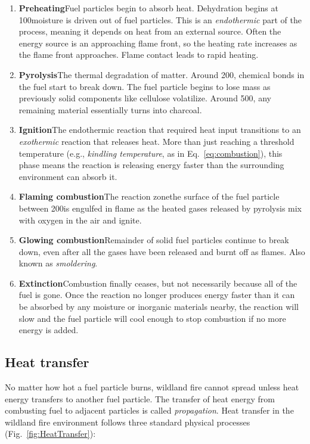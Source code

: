 \begin{enumerate} 
	\item \textbf{Preheating\textemdash}Fuel particles begin to absorb heat. Dehydration begins at 100\degC\textemdash moisture is driven out of fuel particles. This is an \emph{endothermic} part of the process, meaning it depends on heat from an external source. Often the energy source is an approaching flame front, so the heating rate increases as the flame front approaches. Flame contact leads to rapid heating. 
	\item \textbf{Pyrolysis\textemdash}The thermal degradation of matter. Around 200\degC, chemical bonds in the fuel start to break down. The fuel particle begins to lose mass as previously solid components like cellulose volatilize. Around 500\degC, any remaining material essentially turns into charcoal. 
	\item \textbf{Ignition\textemdash}The endothermic reaction that required heat input transitions to an \emph{exothermic} reaction that releases heat. More than just reaching a threshold temperature (e.g., \emph{kindling temperature}, as in Eq.~\ref{eq:combustion}), this phase means the reaction is releasing energy faster than the surrounding environment can absorb it.
	\item \textbf{Flaming combustion\textemdash}The reaction zone\textemdash the surface of the fuel particle between 200\degC\textemdash is engulfed in flame as the heated gases released by pyrolysis mix with oxygen in the air and ignite.
	\item \textbf{Glowing combustion\textemdash}Remainder of solid fuel particles continue to break down, even after all the gases have been released and burnt off as flames. Also known as \emph{smoldering}. 
	\item \textbf{Extinction\textemdash}Combustion finally ceases, but not necessarily because all of the fuel is gone. Once the reaction no longer produces energy faster than it can be absorbed by any moisture or inorganic materials nearby, the reaction will slow and the fuel particle will cool enough to stop combustion if no more energy is added. 
\end{enumerate}

\subsection{Heat transfer}

No matter how hot a fuel particle burns, wildland fire cannot spread unless heat energy transfers to another fuel particle. 
The transfer of heat energy from combusting fuel to adjacent particles is called \emph{propagation}. 
Heat transfer in the wildland fire environment follows three standard physical processes (Fig.~\ref{fig:HeatTransfer}): 

